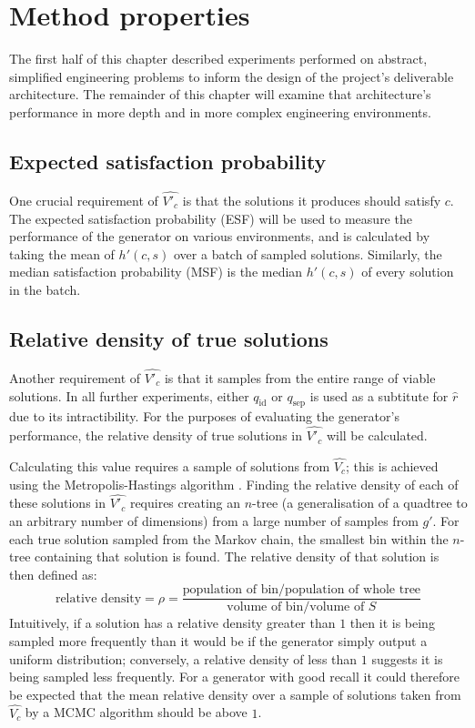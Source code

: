 \documentclass[../../main.tex]{subfiles}
\begin{document}
\section{Method properties} \label{section:methodProperties}

The first half of this chapter described experiments performed on abstract, simplified engineering problems to inform the design of the project's deliverable architecture.
The remainder of this chapter will examine that architecture's performance in more depth and in more complex engineering environments.

\subsection{Expected satisfaction probability} \label{subsection:expectedSatisfactionProbability}

One crucial requirement of $\hat{V'_c}$ is that the solutions it produces should satisfy $c$.
The expected satisfaction probability (ESF) will be used to measure the performance of the generator on various environments, and is calculated by taking the mean of $h'(c,s)$ over a batch of sampled solutions.
Similarly, the median satisfaction probability (MSF) is the median $h'(c,s)$ of every solution in the batch.

\subsection{Relative density of true solutions} \label{subsection:relativeDensityOfTrueSolutions}

Another requirement of $\hat{V'_c}$ is that it samples from the entire range of viable solutions.
In all further experiments, either $q_\text{id}$ or $q_\text{sep}$ is used as a subtitute for $\hat{r}$ due to its intractibility.
For the purposes of evaluating the generator's performance, the relative density of true solutions in $\hat{V'_c}$ will be calculated.

Calculating this value requires a sample of solutions from $\hat{V_c}$; this is achieved using the Metropolis-Hastings algorithm \cite{robert16}.
Finding the relative density of each of these solutions in $\hat{V'_c}$ requires creating an $n$-tree (a generalisation of a quadtree to an arbitrary number of dimensions) from a large number of samples from $g'$.
For each true solution sampled from the Markov chain, the smallest bin within the $n$-tree containing that solution is found.
The relative density of that solution is then defined as:
\begin{equation}
    \text{relative density}=\rho=\frac{\text{population of bin}/\text{population of whole tree}}{\text{volume of bin}/\text{volume of }S}
\end{equation}
Intuitively, if a solution has a relative density greater than $1$ then it is being sampled more frequently than it would be if the generator simply output a uniform distribution; conversely, a relative density of less than $1$ suggests it is being sampled less frequently.
For a generator with good recall it could therefore be expected that the mean relative density over a sample of solutions taken from $\hat{V_c}$ by a MCMC algorithm should be above $1$.
\end{document}
